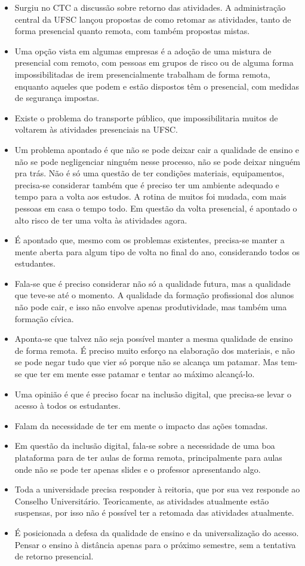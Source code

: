 \documentclass{ata-calico}
\begin{document}
\begin{itemize}
\item Surgiu no CTC a discussão sobre retorno das atividades. A administração central da UFSC lançou propostas de como retomar as atividades, tanto de forma presencial quanto remota, com também propostas mistas.
\item Uma opção vista em algumas empresas é a adoção de uma mistura de presencial com remoto, com pessoas em grupos de risco ou de alguma forma impossibilitadas de irem presencialmente trabalham de forma remota, enquanto aqueles que podem e estão dispostos têm o presencial, com medidas de segurança impostas.
\item Existe o problema do transporte público, que impossibilitaria muitos de voltarem às atividades presenciais na UFSC.
\item Um problema apontado é que não se pode deixar cair a qualidade de ensino e não se pode negligenciar ninguém nesse processo, não se pode deixar ninguém pra trás. Não é só uma questão de ter condições materiais, equipamentos, precisa-se considerar também que é preciso ter um ambiente adequado e tempo para a volta aos estudos. A rotina de muitos foi mudada, com mais pessoas em casa o tempo todo. Em questão da volta presencial, é apontado o alto risco de ter uma volta às atividades agora.
\item É apontado que, mesmo com os problemas existentes, precisa-se manter a mente aberta para algum tipo de volta no final do ano, considerando todos os estudantes.
\item Fala-se que é preciso considerar não só a qualidade futura, mas a qualidade que teve-se até o momento. A qualidade da formação profissional dos alunos não pode cair, e isso não envolve apenas produtividade, mas também uma formação cívica.
\item Aponta-se que talvez não seja possível manter a mesma qualidade de ensino de forma remota. É preciso muito esforço na elaboração dos materiais, e não se pode negar tudo que vier só porque não se alcança um patamar. Mas tem-se que ter em mente esse patamar e tentar ao máximo alcançá-lo.
\item Uma opinião é que é preciso focar na inclusão digital, que precisa-se levar o acesso à todos os estudantes.
\item Falam da necessidade de ter em mente o impacto das ações tomadas.
\item Em questão da inclusão digital, fala-se sobre a necessidade de uma boa plataforma para de ter aulas de forma remota, principalmente para aulas onde não se pode ter apenas slides e o professor apresentando algo.
\item Toda a universidade precisa responder à reitoria, que por sua vez responde ao Conselho Universitário. Teoricamente, as atividades atualmente estão suspensas, por isso não é possível ter a retomada das atividades atualmente.
\item É posicionada a defesa da qualidade de ensino e da universalização do acesso. Pensar o ensino à distância apenas para o próximo semestre, sem a tentativa de retorno presencial.
\end{itemize}
\end{document}
